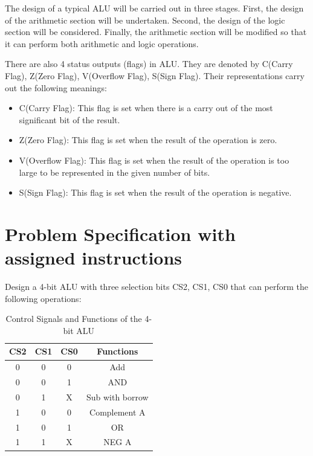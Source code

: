 \documentclass[11pt]{article}
\begin{document}
The design of a typical ALU will be carried out in three stages. First, the design of the 
arithmetic section will be undertaken. Second, the design of the logic section will be considered. 
Finally, the arithmetic section will be modified so that it can perform both arithmetic and logic 
operations.

There are also 4 status outputs (flags) in ALU. They are denoted by C(Carry
Flag), Z(Zero Flag), V(Overflow Flag), S(Sign Flag). Their representations carry out the
following meanings:
\begin{itemize}
    \item C(Carry Flag): This flag is set when there is a carry out of the most significant bit of the result.
    \item Z(Zero Flag): This flag is set when the result of the operation is zero.
    \item V(Overflow Flag): This flag is set when the result of the operation is too large to be represented in the given number of bits.
    \item S(Sign Flag): This flag is set when the result of the operation is negative.
\end{itemize}

\section{Problem Specification with assigned instructions}
Design a 4-bit ALU with three selection bits CS2, CS1, CS0 that can perform the following operations:
\begin{table}[ht]
    \centering
    \begin{tabular}{|c|c|c|c|}
        \hline
        \textbf{CS2} & \textbf{CS1} & \textbf{CS0} & \textbf{Functions} \\
        \hline
        0 & 0 & 0 & Add \\
        \hline
        0 & 0 & 1 & AND \\
        \hline
        0 & 1 & X & Sub with borrow \\
        \hline
        1 & 0 & 0 & Complement A \\
        \hline
        1 & 0 & 1 & OR \\
        \hline
        1 & 1 & X & NEG A \\
        \hline
    \end{tabular}
    \caption{Control Signals and Functions of the 4-bit ALU}
\end{table}
\end{document}
